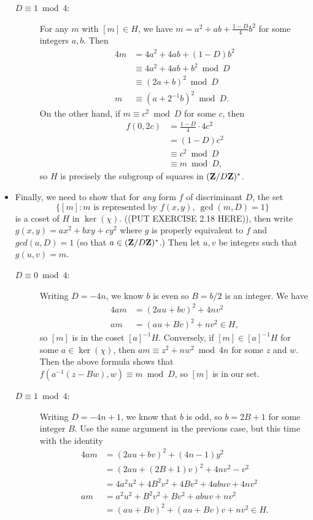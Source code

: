 \begin{itemize}
\begin{description}
  \item [$D\equiv 1\bmod 4$:]
  For any $m$ with $[m]\in H$, we have $m=a^2+ab+\frac{1-D}{4}b^2$ for some integers $a, b$. Then
  \begin{align*}
    4m&=4a^2+4ab+(1-D)b^2\\
      &\equiv 4a^2+4ab+b^2\bmod D\\
      &\equiv (2a+b)^2\bmod D\\
     m&\equiv (a+2^{-1}b)^2\bmod D.
  \end{align*}
  On the other hand, if $m\equiv c^2\bmod D$ for some $c$, then
  \begin{align*}
  f(0, 2c)&=\frac{1-D}{4}\cdot 4c^2\\
          &=(1-D)c^2\\
          &\equiv c^2\bmod D\\
          &\equiv m\bmod D,
  \end{align*}
  so $H$ is precisely the subgroup of squares in $(\mathbf{Z}/D\mathbf{Z})^*$.
\end{description}

\item Finally, we need to show that for \emph{any} form $f$ of discriminant $D$, the set
\[\{[m]: m\text{ is represented by }f(x,y),\ \gcd(m, D)=1\}\]
is a coset of $H$ in $\ker(\chi)$. ((PUT EXERCISE 2.18 HERE)), then write $g(x,y)=ax^2+bxy+cy^2$ where $g$ is properly equivalent to $f$ and $gcd(a,D)=1$ (so that $a\in(\mathbf{Z}/D\mathbf{Z})^*$.) Then let $u,v$ be integers such that $g(u,v)=m$.
\begin{description}
  \item [$D\equiv 0\bmod 4$:]
  Writing $D=-4n$, we know $b$ is even so $B=b/2$ is an integer. We have
  \begin{align*}
    4am&=(2au+bv)^2+4nv^2\\
     am&=(au+Bv)^2+nv^2\in H,
  \end{align*}
  so $[m]$ is in the coset $[a]^{-1}H$. Conversely, if $[m]\in[a]^{-1}H$ for some $a\in\ker(\chi)$, then $am\equiv z^2+nw^2\bmod 4n$ for some $z$ and $w$. Then the above formula shows that $f(a^{-1}(z-Bw), w)\equiv m\bmod D$, so $[m]$ is in our set.

  \item [$D\equiv 1\bmod 4$:]
  Writing $D=-4n+1$, we know that $b$ is odd, so $b=2B+1$ for some integer $B$. Use the same argument in the previous case, but this time with the identity
  \begin{align*}
    4am&=(2au+bv)^2+(4n-1)y^2\\
       &=(2au+(2B+1)v)^2+4nv^2-v^2\\
       &=4a^2u^2+4B^2v^2+4Bv^2+4abuv+4nv^2\\
     am&=a^2u^2+B^2v^2+Bv^2+abuv+nv^2\\
       &=(au+Bv)^2+(au+Bv)v+nv^2\in H.
  \end{align*}
\end{description}
\end{itemize}

